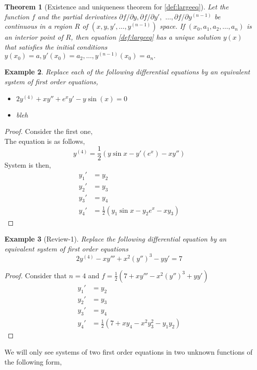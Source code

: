 \documentclass[oneside,11pt,pdftex,final]{book}%
\numberwithin{equation}{section}
\newtheorem{theorem}{Theorem}[chapter]%
\newtheorem{example}[theorem]{Example}
\numberwithin{section}{chapter}
\numberwithin{equation}{chapter}
\begin{document}
\begin{theorem}[Existence and uniqueness theorem for \ref{def:largeeq}]
	Let the function $ f $ and the partial derivatives $ \partial f/\partial y, \partial f/ \partial y',$ $\dots, \partial f/\partial y^{(n-1)} $ be continuous in a region $ R $ of $ (x,y,y',\dots, y^{(n-1)}) $ space. If $ (x_0, a_1, a_2, \dots, a_n) $ is an interior point of $ R $, then equation \ref{def:largeeq} has a unique solution $ y(x) $ that satisfies the initial conditions $ y(x_0) =a, y'(x_0)=a_2,\dots, y^{(n-1)}(x_0)=a_n.$
\end{theorem}

\begin{example}
	Replace each of the following differential equations by an equivalent system of first order equations,
	\begin{itemize}
		\item $ 2y^{(4)} +xy''+e^x y'-y \sin(x)=0$
		\item bleh
	\end{itemize}
\end{example}
\begin{proof}
	Consider the first one,\\
	The equation is as follows,
	\[ y^{(4)}=\frac{1}{2} \left( y \sin x - y'(e^x)-xy'' \right)\]
	System is then,
	\begin{align*}
		y_1'&=y_2\\
		y_2'&=y_3\\
		y_3'&=y_4\\
		y_4'&=\frac{1}{2}\left(y_1 \sin x - y_2 e^x - xy_3\right)
	\end{align*}
\end{proof}

\begin{example}[Review-1]
	Replace the following differential equation by an equivalent system of first order equations \[ 2y^{(4)}-xy'''+x^2(y'')^3-yy' =7\]
\end{example}
\begin{proof}
	Consider that $ n=4 $ and $ f=\frac{1}{2} \left( 7+xy'''-x^2(y'')^3+yy' \right)$
	\begin{align*}
		y_1'&=y_2\\
		y_2'&=y_3\\
		y_3'&=y_4\\
		y_4'&=\frac{1}{2}\left( 7+ xy_4-x^2y_3^2-y_1y_2 \right)
	\end{align*}
\end{proof}

We will only see systems of two first order equations in two unknown functions of the following form,
\end{document}
